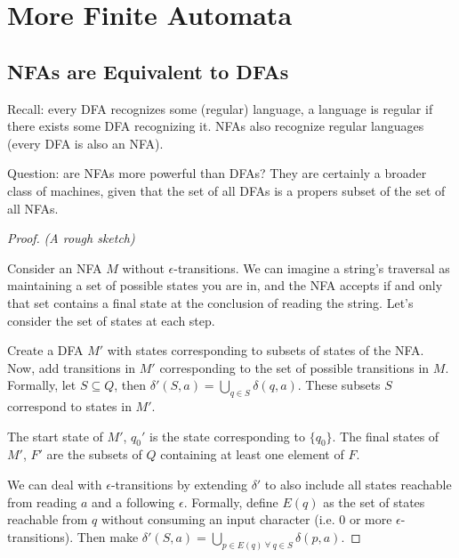 


\section*{More Finite Automata}


\subsection*{NFAs are Equivalent to DFAs}
Recall: every DFA recognizes some (regular) language, a language is regular if there exists some DFA recognizing it.  NFAs also recognize regular languages (every DFA is also an NFA).

Question: are NFAs more powerful than DFAs?  They are certainly a broader class of machines, given that the set of all DFAs is a propers subset of the set of all NFAs.


\begin{proof}
	\textit{(A rough sketch)}
	
	Consider an NFA $M$ without $\epsilon$-transitions.  We can imagine a string's traversal as maintaining a set of possible states you are in, and the NFA accepts if and only that set contains a final state at the conclusion of reading the string.  Let's consider the set of states at each step.
	
	Create a DFA $M'$ with states corresponding to subsets of states of the NFA.  Now, add transitions in $M'$ corresponding to the set of possible transitions in $M$.  Formally, let $S\subseteq Q$, then $\delta ' (S,a) = \bigcup\limits_{q\in S} \delta (q,a)$.  These subsets $S$ correspond to states in $M'$.
	
	The start state of $M'$, $q_0 '$ is the state corresponding to $\{q_0\}$.  The final states of $M'$, $F'$ are the subsets of $Q$ containing at least one element of $F$.
	
	We can deal with $\epsilon$-transitions by extending $\delta '$ to also include all states reachable from reading $a$ and a following $\epsilon$.  Formally, define $E(q)$ as the set of states reachable from $q$ without consuming an input character (i.e. $0$ or more $\epsilon$-transitions).  Then make $\delta '(S,a) = \bigcup\limits_{p\in E(q)  \ \forall \  q\in S}\delta(p,a)$.
	
	

	
\end{proof}


